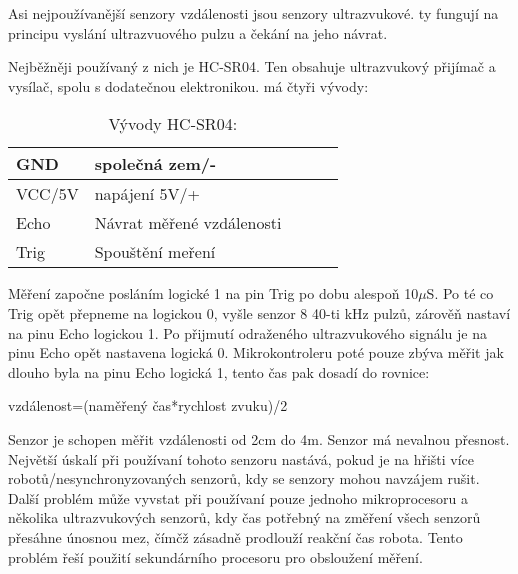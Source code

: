 Asi nejpoužívanější senzory vzdálenosti jsou senzory ultrazvukové. ty fungují na principu vyslání ultrazvuového pulzu a čekání na jeho návrat.


Nejběžněji používaný z nich je HC-SR04. 
Ten obsahuje ultrazvukový přijímač a vysílač, spolu s dodatečnou elektronikou.
má čtyři vývody: 
\begin{table}[]
	\caption{Vývody HC-SR04:}
	\centering
	\begin{tabular}{|l|l|l|l|l|} \hline
		GND & společná zem/-   \\ \hline
		VCC/5V & napájení 5V/+  \\ \hline
		Echo & Návrat měřené vzdálenosti   \\ \hline
		Trig & Spouštění meření \\ \hline
	\end{tabular}
\end{table}
Měření započne posláním logické 1 na pin Trig po dobu alespoň 10$\mu$S.
Po té co Trig opět přepneme na logickou 0, vyšle senzor 8 40-ti kHz pulzů, zárověň nastaví na pinu Echo logickou 1.
Po přijmutí odraženého ultrazvukového signálu je na pinu Echo opět nastavena logická 0.
Mikrokontroleru poté pouze zbýva měřit jak dlouho byla na pinu Echo logická 1, tento čas pak dosadí do rovnice:
\begin{center}
    vzdálenost=(naměřený čas*rychlost zvuku)/2
\end{center} 
Senzor je schopen měřit vzdálenosti od 2cm do 4m.
Senzor má nevalnou přesnost.
Největší úskalí při používaní tohoto senzoru nastává, pokud je na hřišti více robotů/nesynchronyzovaných senzorů, kdy se senzory mohou navzájem rušit.
Další problém může vyvstat při používaní pouze jednoho mikroprocesoru a několika ultrazvukových senzorů, kdy čas potřebný na změření všech senzorů přesáhne únosnou mez, čímčž zásadně prodlouží reakční čas robota.
Tento problém řeší použití sekundárního procesoru pro obsloužení měření.
